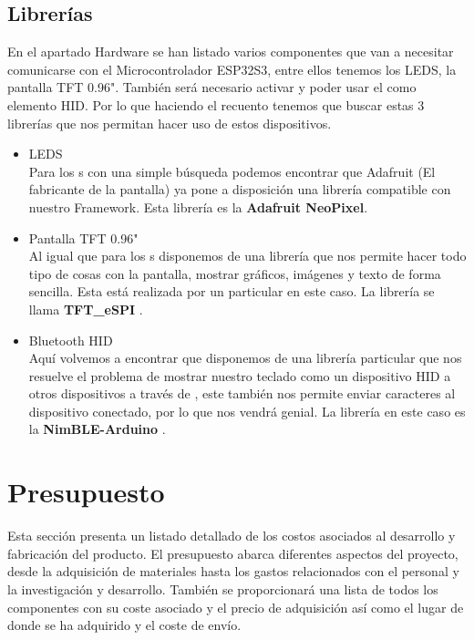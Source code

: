 \subsection{Librerías} \label{DiseñoLibrerias}
En el apartado Hardware se han listado varios componentes que van a necesitar comunicarse con el Microcontrolador ESP32S3, entre ellos tenemos los \gls{LED}S, la pantalla \gls{TFT} 0.96". También será necesario activar y poder usar el  como elemento \gls{HID}. Por lo que haciendo el recuento tenemos que buscar estas 3 librerías que nos permitan hacer uso de estos dispositivos.
\begin{itemize}
    \item \gls{LED}S\\
    Para los s con una simple búsqueda podemos encontrar que Adafruit (El fabricante de la pantalla) ya pone a disposición una librería compatible con nuestro Framework. Esta librería es la \textbf{Adafruit NeoPixel}.
    \item Pantalla \gls{TFT} 0.96"\\
    Al igual que para los s disponemos de una librería que nos permite hacer todo tipo de cosas con la pantalla, mostrar gráficos, imágenes y texto de forma sencilla. Esta está realizada por un particular en este caso. La librería se llama \textbf{TFT\_eSPI} \cite{TFTLib}.
    \item \gls{Bluetooth} \gls{HID}\\
    Aquí volvemos a encontrar que disponemos de una librería particular que nos resuelve el problema de mostrar nuestro teclado como un dispositivo \gls{HID} a otros dispositivos a través de , este también nos permite enviar caracteres al dispositivo conectado, por lo que nos vendrá genial. La librería en este caso es la \textbf{NimBLE-Arduino} \cite{NimbleLib}.
\end{itemize}

\section{Presupuesto}
Esta sección presenta un listado detallado de los costos asociados al desarrollo y fabricación del producto. El presupuesto abarca diferentes aspectos del proyecto, desde la adquisición de materiales hasta los gastos relacionados con el personal y la investigación y desarrollo. También se proporcionará una lista de todos los componentes con su coste asociado y el precio de adquisición así como el lugar de donde se ha adquirido y el coste de envío. 

